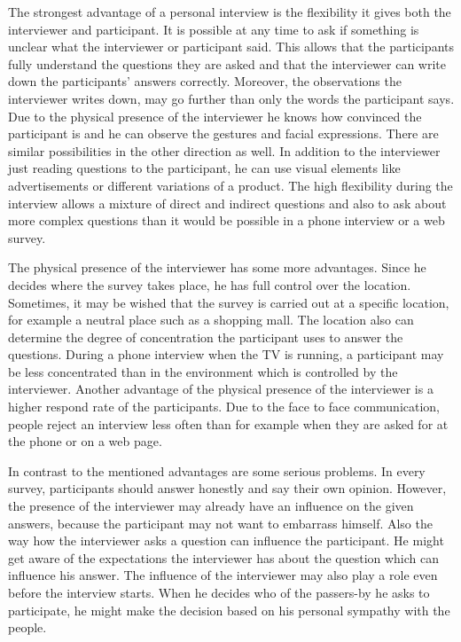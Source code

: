 \documentclass{report}
\begin{document}
The strongest advantage of a personal interview is the flexibility it gives both the interviewer and participant. It is possible at any time to ask if something is unclear what the interviewer or participant said. This allows that the participants fully understand the questions they are asked and that the interviewer can write down the participants’ answers correctly. Moreover, the observations the interviewer writes down, may go further than only the words the participant says. Due to the physical presence of the interviewer he knows how convinced the participant is and he can observe the gestures and facial expressions. There are similar possibilities in the other direction as well. In addition to the interviewer just reading questions to the participant, he can use visual elements like advertisements or different variations of a product. The high flexibility during the interview allows a mixture of direct and indirect questions and also to ask about more complex questions than it would be possible in a phone interview or a web survey.

The physical presence of the interviewer has some more advantages. Since he decides where the survey takes place, he has full control over the location. Sometimes, it may be wished that the survey is carried out at a specific location, for example a neutral place such as a shopping mall. The location also can determine the degree of concentration the participant uses to answer the questions. During a phone interview when the TV is running, a participant may be less concentrated than in the environment which is controlled by the interviewer. Another advantage of the physical presence of the interviewer is a higher respond rate of the participants. Due to the face to face communication, people reject an interview less often than for example when they are asked for at the phone or on a web page.

In contrast to the mentioned advantages are some serious problems. In every survey, participants should answer honestly and say their own opinion. However, the presence of the interviewer may already have an influence on the given answers, because the participant may not want to embarrass himself. Also the way how the interviewer asks a question can influence the participant. He might get aware of the expectations the interviewer has about the question which can influence his answer. The influence of the interviewer may also play a role even before the interview starts. When he decides who of the passers-by he asks to participate, he might make the decision based on his personal sympathy with the people.
\end{document}
